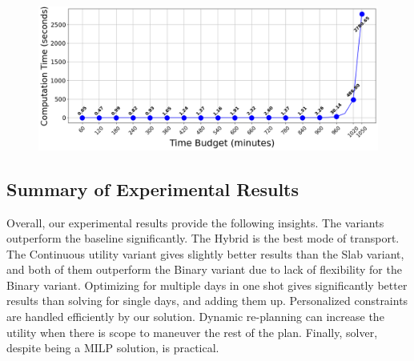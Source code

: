 \begin{figure}[t]
    \centering
    \includegraphics[width=\figwidth]{plots/timebudgetvstoc.png}
    \label{fig:time-budget}
\end{figure}

\subsection{Summary of Experimental Results}

Overall, our experimental results provide the following insights.
The \trip variants outperform the baseline significantly.
The Hybrid is the best mode of transport.
The Continuous utility variant gives slightly better results than the Slab variant, and both of them outperform the Binary variant due to lack of flexibility for the Binary variant.
Optimizing for multiple days in one shot gives significantly better results than solving for single days, and adding them up.
Personalized constraints are handled efficiently by our \trip solution.
Dynamic re-planning can increase the utility when there is scope to maneuver the rest of the plan.
Finally, \trip solver, despite being a MILP solution, is practical.

